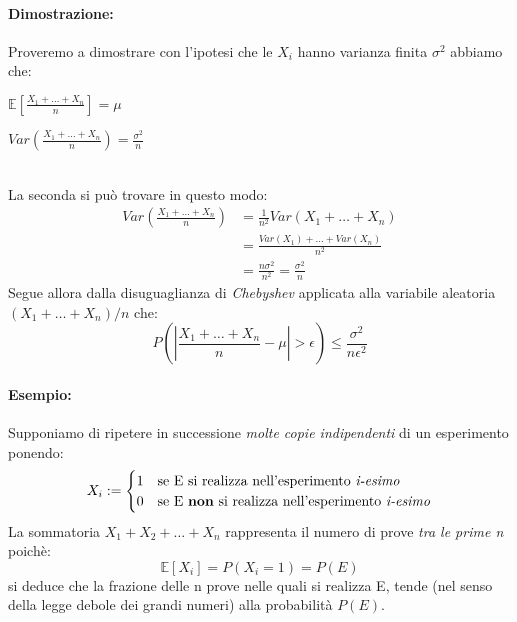 \documentclass[]{article}
\newcommand{\ev}{\mathbb{E}[X]}
\renewcommand{\ev}[1]{\mathbb{E}[#1]}
\begin{document}
    \paragraph{Dimostrazione:} Proveremo a dimostrare con l'ipotesi che le $X_i$ hanno varianza finita $\sigma^2$ abbiamo che: \\
    \begin{minipage}{0.4\textwidth}
        $ \ev{\frac{X_1 + \ldots + X_n}{n}} = \mu $
    \end{minipage}
    \begin{minipage}{0.4\textwidth}
        $ Var(\frac{X_1 + \ldots + X_n}{n}) = \frac{\sigma^2}{n} $
    \end{minipage} \\
    \linebreak[4]
    La seconda si può trovare in questo modo:
    \begin{equation*}
        \begin{split}
            Var(\frac{X_1 + \ldots + X_n}{n}) & = \frac{1}{n^2} Var(X_1 + \ldots + X_n) \\
            & = \frac{Var(X_1) + \ldots + Var(X_n)}{n^2} \\
            & = \frac{n\sigma^2}{n^2} = \frac{\sigma^2}{n}
        \end{split}
    \end{equation*}
    Segue allora dalla disuguaglianza di \textit{Chebyshev} applicata alla variabile aleatoria $(X_1 + \ldots + X_n)/n$ che:
    \[ P(| \frac{X_1 + \ldots + X_n}{n} - \mu | > \epsilon) \leq \frac{\sigma^2}{n\epsilon^2}\]
    \paragraph{Esempio:} Supponiamo di ripetere in successione \textit{molte copie indipendenti} di un esperimento ponendo:
    \begin{equation*}
        X_i :=
        \begin{cases}
            1 & \text{se E si realizza nell'esperimento \textit{i-esimo}} \\
            0 & \text{se E \textbf{non} si realizza nell'esperimento \textit{i-esimo}}
        \end{cases}
    \end{equation*}
    La sommatoria $X_1 + X_2 + \ldots + X_n$ rappresenta il numero di prove \textit{tra le prime n} poichè:
    \[ \ev{X_i} = P(X_i = 1) = P(E) \]
    si deduce che la frazione delle n prove nelle quali si realizza E, tende (nel senso della
    legge debole dei grandi numeri) alla probabilità $P(E)$.
\end{document}
